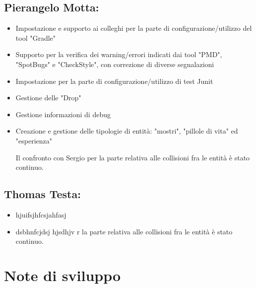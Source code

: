 \documentclass[a4paper,12pt]{report}
\begin{document}
\paragraph{}

\subsection*{Pierangelo Motta:}
\begin{itemize}
	\item Impostazione e supporto ai colleghi per la parte di configurazione/utilizzo del tool "Gradle"
	\item Supporto per la verifica dei warning/errori indicati dai tool "PMD", "SpotBugs" e "CheckStyle", con correzione di diverse segnalazioni 
	\item Impostazione per la parte di configurazione/utilizzo di test Junit
	\item Gestione delle "Drop"
	\item Gestione informazioni di debug
	\item Creazione e gestione delle tipologie di entità: "mostri", "pillole di vita" ed "esperienza"
	
	Il confronto con Sergio per la parte relativa alle collisioni fra le entità è stato continuo.
\end{itemize}
\subsection*{Thomas Testa:}
\begin{itemize}
	\item hjuifsjhfcsjahfasj
	\item dsbhnfcjdsj hjsdhjv r la parte relativa alle collisioni fra le entità è stato continuo.
\end{itemize}

\paragraph{}


\section{Note di sviluppo}
\end{document}
